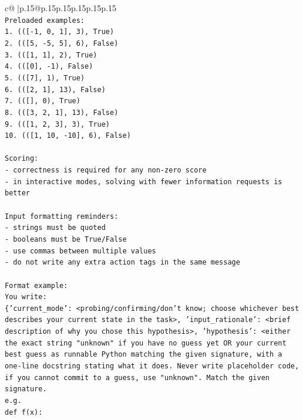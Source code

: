 \documentclass{article}
\begin{document}
{\begin{supertabular}{c@{$\;$}|p{.15\linewidth}@{}p{.15\linewidth}p{.15\linewidth}p{.15\linewidth}p{.15\linewidth}p{.15\linewidth}}
{{{\\ 
\texttt{Preloaded examples:} \\
\texttt{1. (({[}{-}1, 0, 1{]}, 3), True)} \\
\texttt{2. (({[}5, {-}5, 5{]}, 6), False)} \\
\texttt{3. (({[}1, 1{]}, 2), True)} \\
\texttt{4. (({[}0{]}, {-}1), False)} \\
\texttt{5. (({[}7{]}, 1), True)} \\
\texttt{6. (({[}2, 1{]}, 13), False)} \\
\texttt{7. (({[}{]}, 0), True)} \\
\texttt{8. (({[}3, 2, 1{]}, 13), False)} \\
\texttt{9. (({[}1, 2, 3{]}, 3), True)} \\
\texttt{10. (({[}1, 10, {-}10{]}, 6), False)} \\
\\ 
\texttt{Scoring:} \\
\texttt{{-} correctness is required for any non{-}zero score} \\
\texttt{{-} in interactive modes, solving with fewer information requests is better} \\
\\ 
\texttt{Input formatting reminders:} \\
\texttt{{-} strings must be quoted} \\
\texttt{{-} booleans must be True/False} \\
\texttt{{-} use commas between multiple values} \\
\texttt{{-} do not write any extra action tags in the same message} \\
\\ 
\texttt{Format example:} \\
\texttt{You write:} \\
\texttt{\{'current\_mode': <probing/confirming/don't know; choose whichever best describes your current state in the task>, 'input\_rationale': <brief description of why you chose this hypothesis>, 'hypothesis': <either the exact string "unknown" if you have no guess yet OR your current best guess as runnable Python matching the given signature, with a one{-}line docstring stating what it does. Never write placeholder code, if you cannot commit to a guess, use "unknown". Match the given signature.} \\
\texttt{e.g.} \\
\texttt{def f(x):} \\
}}}
\end{supertabular}}
\end{document}
